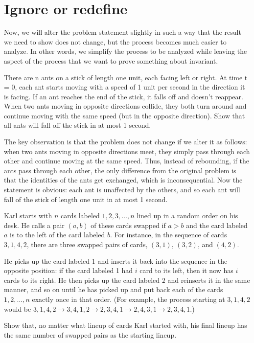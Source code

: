 \section{Ignore or redefine}
Now, we will alter the problem statement slightly in such a way that the result we need to show does not change, but the process becomes much easier to analyze. In other words, we simplify the process to be analyzed while leaving the aspect of the process that we want to prove something about invariant. 
\begin{example}
There are n ants on a stick of length one unit, each facing left or 
right. At time t = 0, each ant starts moving with a speed of 1 unit 
per second in the direction it is facing. If an ant reaches the end of 
the stick, it falls off and doesn’t reappear. When two ants moving 
in opposite directions collide, they both turn around and continue 
moving with the same speed (but in the opposite direction). Show 
that all ants will fall off the stick in at most 1 second.
\end{example}
The key observation is that the problem does not change if we alter 
it as follows: when two ants moving in opposite directions meet, 
they simply pass through each other and continue moving at the 
same speed. Thus, instead of rebounding, if the ants pass through 
each other, the only difference from the original problem is that 
the identities of the ants get exchanged, which is inconsequential. 
Now the statement is obvious: each ant is unaffected by the 
others, and so each ant will fall of the stick of length one unit in at 
most 1 second. 

\begin{example} [USAJMO 2018]
Karl starts with $n$ cards labeled $1,2,3,\dots,n$ lined up in a random order on his desk. He calls a pair $(a,b)$ of these cards swapped if $a>b$ and the card labeled $a$ is to the left of the card labeled $b$. For instance, in the sequence of cards $3,1,4,2$, there are three swapped pairs of cards, $(3,1)$, $(3,2)$, and $(4,2)$.

He picks up the card labeled 1 and inserts it back into the sequence in the opposite position: if the card labeled 1 had $i$ card to its left, then it now has $i$ cards to its right. He then picks up the card labeled $2$ and reinserts it in the same manner, and so on until he has picked up and put back each of the cards $1,2,\dots,n$ exactly once in that order. (For example, the process starting at $3,1,4,2$ would be $3,1,4,2\to 3,4,1,2\to 2,3,4,1\to 2,4,3,1\to 2,3,4,1$.)

Show that, no matter what lineup of cards Karl started with, his final lineup has the same number of swapped pairs as the starting lineup.
\end{example}

